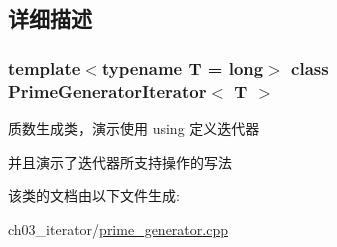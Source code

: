 \subsection{详细描述}
\subsubsection*{template$<$typename T = long$>$\newline
class Prime\+Generator\+Iterator$<$ T $>$}

质数生成类，演示使用 using 定义迭代器 

并且演示了迭代器所支持操作的写法 

该类的文档由以下文件生成\+:\begin{DoxyCompactItemize}
\item 
ch03\+\_\+iterator/\mbox{\hyperlink{prime__generator_8cpp}{prime\+\_\+generator.\+cpp}}\end{DoxyCompactItemize}
